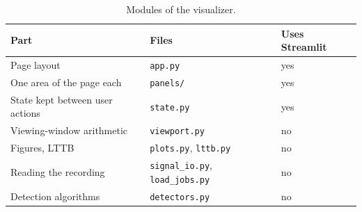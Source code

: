 \begin{table}[H]
  \centering
  \caption{Modules of the visualizer.}
  \label{tab:vis-modules}
  \begin{tabular}{lll}
    \toprule
    Part & Files & Uses Streamlit \\
    \midrule
    Page layout & \texttt{app.py} & yes \\
    One area of the page each & \texttt{panels/} & yes \\
    State kept between user actions & \texttt{state.py} & yes \\
    Viewing-window arithmetic & \texttt{viewport.py} & no \\
    Figures, LTTB & \texttt{plots.py}, \texttt{lttb.py} & no \\
    Reading the recording & \texttt{signal\_io.py}, \texttt{load\_jobs.py} & no \\
    Detection algorithms & \texttt{detectors.py} & no \\
    \bottomrule
  \end{tabular}
\end{table}
